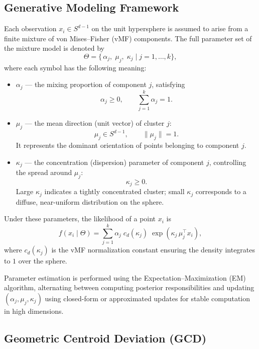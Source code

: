 \documentclass[12pt,a4paper]{report}
\begin{document}
\subsection{Generative Modeling Framework}

Each observation $x_i \in S^{d-1}$ on the unit hypersphere is assumed to arise from a finite mixture of von Mises–Fisher (vMF) components.  
The full parameter set of the mixture model is denoted by
\[
\Theta = \Big\{\, \alpha_j,\; \mu_j,\; \kappa_j \;\Big|\; j = 1,\dots,k \Big\},
\]
where each symbol has the following meaning:

\begin{itemize}
    \item $\alpha_j$ — the mixing proportion of component $j$, satisfying  
    \[
    \alpha_j \ge 0, \qquad \sum_{j=1}^{k} \alpha_j = 1.
    \]
    \item $\mu_j$ — the mean direction (unit vector) of cluster $j$:  
    \[
    \mu_j \in S^{d-1}, \qquad \|\mu_j\| = 1.
    \]
    It represents the dominant orientation of points belonging to component $j$.

    \item $\kappa_j$ — the concentration (dispersion) parameter of component $j$, controlling the spread around $\mu_j$:  
    \[
    \kappa_j \ge 0.
    \]
    Large $\kappa_j$ indicates a tightly concentrated cluster; small $\kappa_j$ corresponds to a diffuse, near-uniform distribution on the sphere.
\end{itemize}

Under these parameters, the likelihood of a point $x_i$ is
\begin{equation}
f(x_i \mid \Theta) = 
\sum_{j=1}^{k} 
\alpha_j \; c_d(\kappa_j)\;
\exp\!\left( \kappa_j\, \mu_j^\top x_i \right),
\end{equation}
where $c_d(\kappa_j)$ is the vMF normalization constant ensuring the density integrates to $1$ over the sphere.

Parameter estimation is performed using the Expectation–Maximization (EM) algorithm, alternating between computing posterior responsibilities and updating $(\alpha_j,\mu_j,\kappa_j)$ using closed-form or approximated updates for stable computation in high dimensions.

\subsection{Geometric Centroid Deviation (GCD)}
\end{document}
